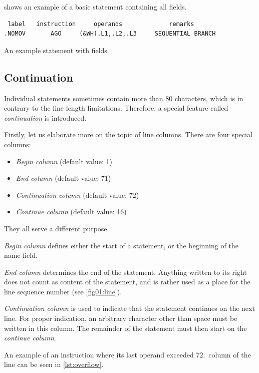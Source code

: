  shows an example of a basic statement containing all fields.

\begin{listing}[p]
\begin{verbatim}
 label   instruction     operands             remarks
.NOMOV       AGO     (&WH).L1,.L2,.L3     SEQUENTIAL BRANCH
\end{verbatim}
\caption{An example statement with fields.}
\label{lst:small_example}
\end{listing}

\subsection{Continuation}
\label{Continuation}

Individual statements sometimes contain more than 80 characters, which is in contrary to the line length limitations. Therefore, a special feature called \emph{continuation} is introduced.

Firstly, let us elaborate more on the topic of line columns. There are four special columns:
\begin{itemize}
	\item \emph{Begin column} (default value: 1)
	
	\item \emph{End column} (default value: 71)
	
	\item \emph{Continuation column} (default value: 72)
	
	\item \emph{Continue column} (default value: 16)
\end{itemize}
They all serve a different purpose.

\emph{Begin column} defines either the start of a statement, or the beginning of the name field.

\emph{End column} determines the end of the statement. Anything written to its right does not count as content of the statement, and is rather used as a place for the line sequence number (see \cref{fig01:line}). 

\emph{Continuation column} is used to indicate that the statement continues on the next line. For proper indication, an arbitrary character other than space must be written in this column. The remainder of the statement must then start on the \emph{continue column}.

An example of an instruction where its last operand exceeded 72.~column of the line can be seen in \cref{lst:overflow}.

